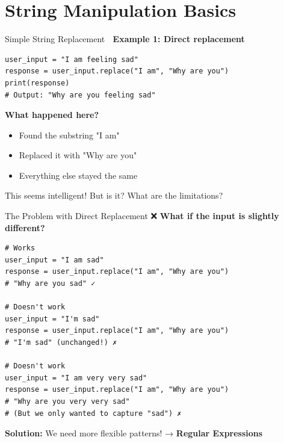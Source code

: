 \documentclass[aspectratio=169]{beamer}
\begin{document}
\section{String Manipulation Basics}

\begin{frame}[fragile]{Simple String Replacement 🔧}
\textbf{Example 1: Direct replacement}

\begin{lstlisting}
user_input = "I am feeling sad"
response = user_input.replace("I am", "Why are you")
print(response)
# Output: "Why are you feeling sad"
\end{lstlisting}

\vspace{0.3cm}

\textbf{What happened here?}
\begin{itemize}\setlength{\itemsep}{0pt}
    \item Found the substring "I am"
    \item Replaced it with "Why are you"
    \item Everything else stayed the same
\end{itemize}

\vspace{0.3cm}

\begin{thinkaboutit}
This seems intelligent! But is it? What are the limitations?
\end{thinkaboutit}
\end{frame}

\begin{frame}[fragile]{The Problem with Direct Replacement ❌}
\textbf{What if the input is slightly different?}

\begin{lstlisting}
# Works
user_input = "I am sad"
response = user_input.replace("I am", "Why are you")
# "Why are you sad" ✓

# Doesn't work
user_input = "I'm sad"
response = user_input.replace("I am", "Why are you")
# "I'm sad" (unchanged!) ✗

# Doesn't work
user_input = "I am very very sad"
response = user_input.replace("I am", "Why are you")
# "Why are you very very sad"
# (But we only wanted to capture "sad") ✗
\end{lstlisting}

\vspace{0.3cm}

\textbf{Solution:} We need more flexible patterns! → \textbf{Regular Expressions}
\end{frame}
\end{document}
